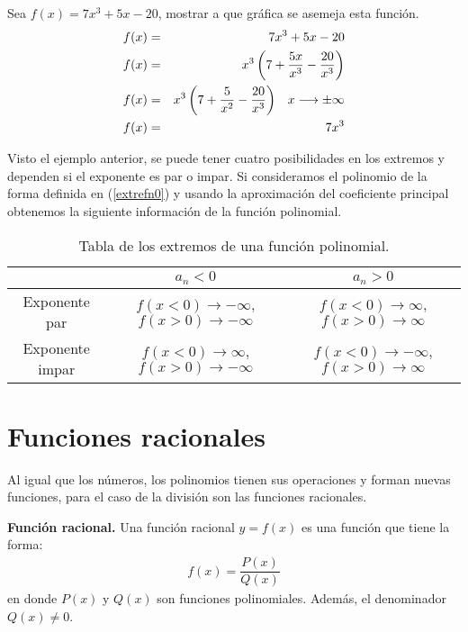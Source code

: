 \begin{myexample}
Sea $f(x)=7x^{3}+5x-20$, mostrar a que gráfica se asemeja esta función.
\begin{eqnarray*}
f(x)&=& 7x^{3}+5x-20 \\
f(x)&=& x^{3}\left(7+\dfrac{5x}{x^{3}}-\dfrac{20}{x^{3}} \right)\\
f(x)&=& x^{3}\left(7+\dfrac{5}{x^{2}} -\dfrac{20}{x^{3}}\right) \hspace{8px} x\longrightarrow \pm\infty\\
f(x)&=& 7x^{3}
\end{eqnarray*}
\end{myexample}
Visto el ejemplo anterior, se puede tener cuatro posibilidades en los extremos y dependen si el exponente es par o impar. Si consideramos el polinomio de la forma definida en (\ref{extrefn0}) y usando la aproximación del coeficiente principal obtenemos la siguiente información de la función polinomial.
\begin{table}[h!]
\begin{center}
		\begin{tabular}{|c|c|c|}
		\hline
		& $a_{n}<0$ & $a_{n}>0$ \\ 
		\hline
		Exponente par & $f(x<0)\longrightarrow -\infty$, $f(x>0)\longrightarrow -\infty$ &  $f(x<0)\longrightarrow \infty$, $f(x>0)\longrightarrow \infty$ \\
		\hline
		Exponente impar & $f(x<0)\longrightarrow \infty$, $f(x>0)\longrightarrow -\infty$ &  $f(x<0)\longrightarrow -\infty$, $f(x>0)\longrightarrow \infty$ \\
		\hline
		\end{tabular}
		\caption[Tabla de los extremos de una función polinomial.]{Tabla de los extremos de una función polinomial.}
\end{center}
\end{table}


\section{Funciones racionales}
\label{funrac0}
Al igual que los números, los polinomios tienen sus operaciones y forman nuevas funciones, para el caso de la división son las funciones racionales. \\

\begin{mydef}
\textbf{Función racional. }Una función racional $y=f(x)$ es una función que tiene la forma:
\begin{eqnarray}
f(x)=\dfrac{P(x)}{Q(x)}
\end{eqnarray}
en donde $P(x)$ y $Q(x)$ son funciones polinomiales. Además, el denominador $Q(x)\neq 0$.
\end{mydef}

